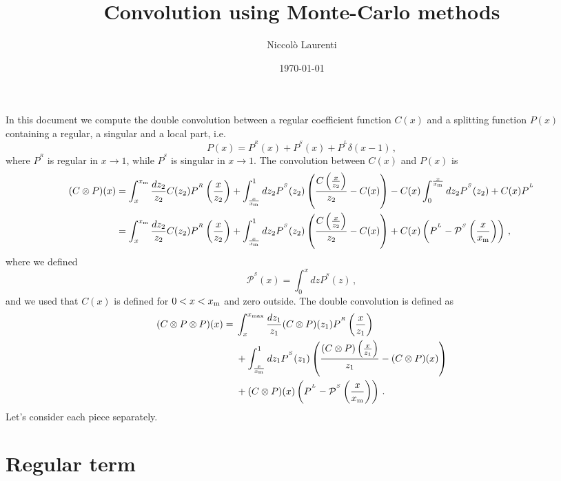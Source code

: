 \documentclass[a4paper]{article}
\title{Convolution using Monte-Carlo methods}
\author{Niccolò Laurenti}
\date{\today}
\newcommand{\PR}[0]{P^{^R}}
\newcommand{\PS}[0]{P^{^S}}
\newcommand{\PmS}[0]{\mathcal{P}^{^S}}
\newcommand{\PL}[0]{P^{^L}}
\newcommand{\xm}[0]{x_{\rm m}}
\begin{document}
	In this document we compute the double convolution between a regular coefficient function $C(x)$ and a splitting function $P(x)$ containing a regular, a singular and a local part, i.e.
	\begin{equation}
		P(x) = P^{^R}(x) + P^{^S}(x) + P^{^L} \delta(x-1)\, ,
	\end{equation}
where $\PR$ is regular in $x\rightarrow 1$, while $\PS$ is singular in $x\rightarrow 1$.
The convolution between $C(x)$ and $P(x)$ is
\begin{align}
	(C \otimes P)(x)&=\int_x^{\xm} \frac{dz_2}{z_2} C(z_2) \PR \left(\frac{x}{z_2}\right) + \int_{\frac{x}{\xm}}^1dz_2 \PS(z_2) \left( \frac{C\left(\frac{x}{z_2}\right)}{z_2} - C(x)\right)-C(x)\int_0^{\frac{x}{\xm}}dz_2\PS(z_2) + C(x)\PL \notag \\
	&=\int_x^{\xm} \frac{dz_2}{z_2} C(z_2) \PR \left(\frac{x}{z_2}\right) + \int_{\frac{x}{\xm}}^1dz_2 \PS(z_2) \left( \frac{C\left(\frac{x}{z_2}\right)}{z_2} - C(x)\right)+ C(x)\left(\PL - \PmS\left(\frac{x}{\xm}\right)\right) \, ,
\end{align}
where we defined
\begin{equation*}
	\PmS(x) = \int_0^{x}dz\PS(z) \, ,
\end{equation*}
and we used that $C(x)$ is defined for $0<x<\xm$ and zero outside.
The double convolution is defined as
\begin{equation}
	\begin{split}
		(C \otimes P \otimes P)(x)  ={}& \int_x^{x_{\rm max}} \frac{dz_1}{z_1} (C \otimes P)(z_1) \PR \left(\frac{x}{z_1}\right) \\
		&+ \int_{\frac{x}{\xm}}^1dz_1 \PS(z_1) \left( \frac{(C \otimes P)\left(\frac{x}{z_1}\right)}{z_1} - (C \otimes P)(x)\right)\\
		& + (C \otimes P)(x)\left(\PL - \PmS\left(\frac{x}{\xm}\right)\right)\,.
	\end{split}
\end{equation}
Let's consider each piece separately.
\section{Regular term}
\end{document}

